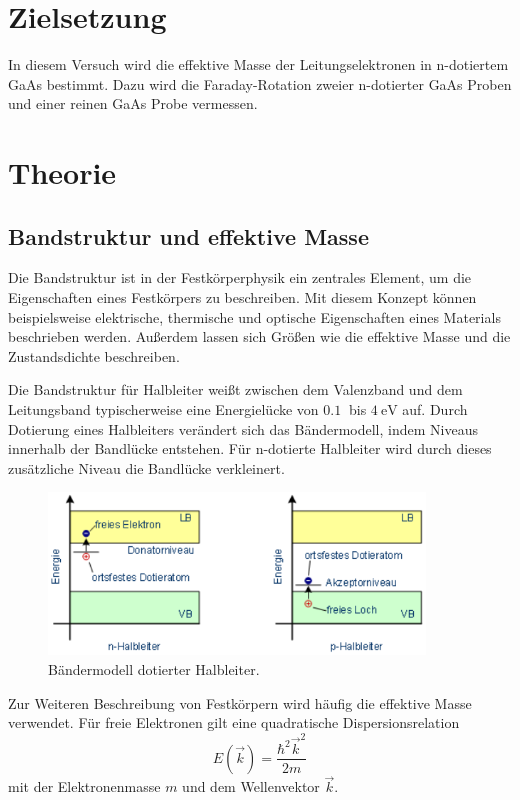 \section{Zielsetzung}
In diesem Versuch wird die effektive Masse der Leitungselektronen in n-dotiertem GaAs bestimmt.
Dazu wird die Faraday-Rotation zweier n-dotierter GaAs Proben und einer reinen GaAs Probe vermessen.

\section{Theorie}
\subsection{Bandstruktur und effektive Masse}

Die Bandstruktur ist in der Festkörperphysik ein zentrales Element, um die Eigenschaften
eines Festkörpers zu beschreiben. Mit diesem Konzept können beispielsweise elektrische, thermische
und optische Eigenschaften eines Materials beschrieben werden. Außerdem lassen sich Größen wie die
effektive Masse und die Zustandsdichte beschreiben.

Die Bandstruktur für Halbleiter weißt zwischen dem Valenzband und dem Leitungsband typischerweise
eine Energielücke von $\SI{0,1}{}$ bis $\SI{4}{\eV}$ auf. Durch Dotierung eines Halbleiters
verändert sich das Bändermodell, indem Niveaus innerhalb der Bandlücke entstehen.
Für n-dotierte Halbleiter wird durch dieses zusätzliche Niveau die Bandlücke verkleinert.

\begin{figure}[H]
  \centering
  \includegraphics[width=10cm]{Bandstruktur.png}
  \caption{Bändermodell dotierter Halbleiter.}
  \label{fig:Band}
\end{figure}

Zur Weiteren Beschreibung von Festkörpern wird häufig die effektive Masse verwendet.
Für freie Elektronen gilt eine quadratische Dispersionsrelation
\begin{equation}
  E(\vec{k})=\frac{\hbar^2 \vec{k}^2}{2m}
\end{equation}
mit der Elektronenmasse $m$ und dem Wellenvektor $\vec{k}$.

